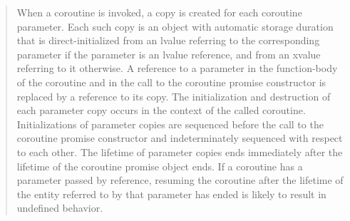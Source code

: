 \begin{quote}

\pnum
When a coroutine is invoked, a copy is created for each coroutine parameter. Each such copy is an object with automatic storage duration that is direct-initialized from an lvalue referring to the corresponding parameter if the parameter is an lvalue reference, and from an xvalue referring to it otherwise. A reference to a parameter in the function-body of the coroutine and in the call to the coroutine promise constructor is replaced by a reference to its copy.
The initialization and destruction of each parameter copy occurs in the context of the called coroutine.
Initializations of parameter copies are sequenced before the call to the coroutine promise constructor and indeterminately sequenced with respect to each other.
The lifetime of parameter copies ends immediately after the lifetime of the coroutine promise object ends.
\enternote
If a coroutine has a parameter passed by reference, resuming the coroutine after the lifetime of the entity referred to by that parameter has ended is likely to result in undefined behavior.
\exitnote
%
%





\end{quote}
